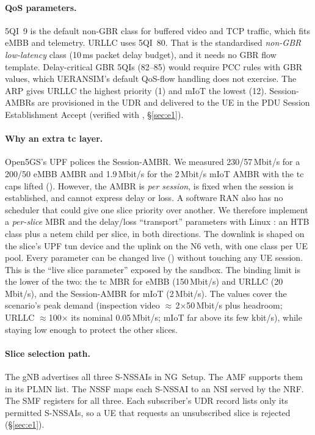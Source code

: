 \paragraph{QoS parameters.} 5QI~9 is the default non-GBR class for buffered video and TCP
traffic, which fits eMBB and telemetry. URLLC uses 5QI~80. That is the standardised
\emph{non-GBR low-latency} class (10\,ms packet delay budget), and it needs no GBR flow
template. Delay-critical GBR 5QIs (82--85) would require PCC rules with GBR values, which
UERANSIM's default QoS-flow handling does not exercise. The ARP gives URLLC the highest
priority (1) and mIoT the lowest (12). Session-AMBRs are provisioned in the UDR and delivered
to the UE in the PDU Session Establishment Accept (verified with ,
\S\ref{sec:e1}).

\paragraph{Why an extra tc layer.} Open5GS's UPF polices the Session-AMBR. We measured
230/57\,Mbit/s for a 200/50 eMBB AMBR and 1.9\,Mbit/s for the 2\,Mbit/s mIoT AMBR with the
tc caps lifted (). However, the AMBR is \emph{per session}, is
fixed when the session is established, and cannot express delay or loss. A software RAN also
has no scheduler that could give one slice priority over another. We therefore implement a
\emph{per-slice} MBR and the delay/loss ``transport'' parameters with Linux : an HTB
class plus a netem child per slice, in both directions. The downlink is shaped on the slice's
UPF tun device and the uplink on the N6 veth, with one class per UE pool. Every parameter can
be changed live () without touching any UE session. This is the
``live slice parameter'' exposed by the sandbox. The binding limit is the lower of the two:
the tc MBR for eMBB (150\,Mbit/s) and URLLC (20\,Mbit/s), and the Session-AMBR for mIoT
(2\,Mbit/s). The values cover the scenario's peak demand (inspection video
$\approx$\,2$\times$50\,Mbit/s plus headroom; URLLC $\approx$100$\times$ its nominal
0.05\,Mbit/s; mIoT far above its few kbit/s), while staying low enough to protect the other
slices.

\paragraph{Slice selection path.} The gNB advertises all three S-NSSAIs in NG~Setup. The AMF
supports them in its PLMN list. The NSSF maps each S-NSSAI to an NSI served by the NRF. The
SMF registers  for all three. Each subscriber's UDR record lists only its
permitted S-NSSAIs, so a UE that requests an unsubscribed slice is rejected
(\S\ref{sec:e1}).
